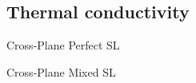 \documentclass{beamer}
\begin{document}



\subsection{Thermal conductivity}
\begin{frame}{Cross-Plane Perfect SL}
\begin{figure}[t]
\begin{center}
\vspace*{-0.8cm}
\renewcommand{\figure}{Fig.}
\label{fig:cp}
\end{center}
\end{figure}
\end{frame}

\begin{frame}{Cross-Plane Mixed SL}
\begin{figure}[t]
\begin{center}
\vspace*{-0.8cm}
\renewcommand{\figure}{Fig.}
\label{fig:cp_all}
\end{center}
\end{figure}
\end{frame}
\end{document}
